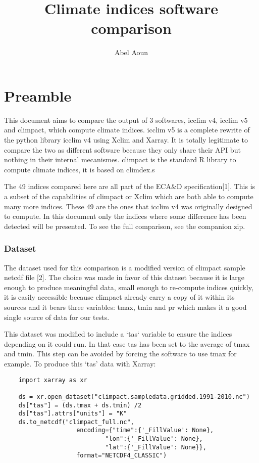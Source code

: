 \documentclass[a4paper,11pt]{article}
\title{Climate indices software comparison}
\author{Abel Aoun}
\begin{document}
\maketitle
\part*{Preamble}
    This document aims to compare the output of 3 softwares, icclim v4, icclim v5 and climpact, which 
    compute climate indices.
    icclim v5 is a complete rewrite of the python library icclim v4 using Xclim and Xarray. It is totally legitimate to compare the two as different software because they only share their API but nothing in their internal mecanismes.
    climpact is the standard R library to compute climate indices, it is based on climdex.s

    The 49 indices compared here are all part of the ECA\&D specification[1].
    This is a subset of the capabilities of climpact or Xclim which are both able to compute many 
    more indices.
    These 49 are the ones that icclim v4 was originally designed to compute.
    In this document only the indices where some difference has been detected will be presented.
    To see the full comparison, see the companion zip.
\section{Dataset}
    The dataset used for this comparison is a modified version of climpact sample netcdf file [2].
    The choice was made in favor of this dataset because it is large enough to produce meaningful data,
    small enough to re-compute indices quickly, it is easily accessible because climpact already 
    carry a copy of it within its sources and it bears three variables: tmax, tmin and pr which 
    makes it a good single source of data for our tests.

    This dataset was modified to include a `tas` variable to ensure the indices depending on it could
    run. In that case tas has been set to the average of tmax and tmin.
    This step can be avoided by forcing the software to use tmax for example.
    To produce this `tas' data with Xarray:
    \begin{lstlisting}
    import xarray as xr

    ds = xr.open_dataset("climpact.sampledata.gridded.1991-2010.nc")
    ds["tas"] = (ds.tmax + ds.tmin) /2
    ds["tas"].attrs["units"] = "K"
    ds.to_netcdf("climpact_full.nc",
                    encoding={"time":{'_FillValue': None},
                            "lon":{'_FillValue': None},
                            "lat":{'_FillValue': None}},
                    format="NETCDF4_CLASSIC")
    \end{lstlisting}
\end{document}
